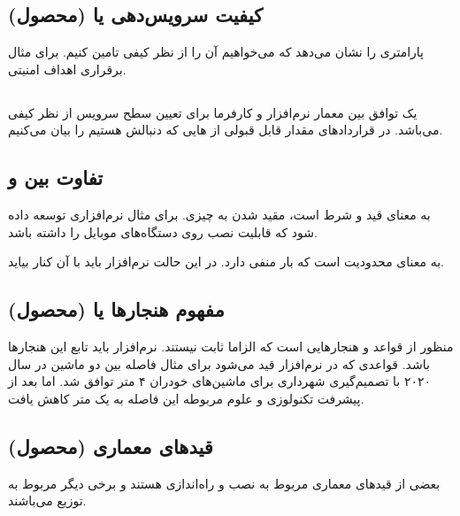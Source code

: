 \subsection{کیفیت سرویس‌دهی یا  (محصول)}

پارامتری را نشان می‌دهد که می‌خواهیم آن را از نظر کیفی تامین کنیم. برای مثال
برقراری اهداف امنیتی.

\subsection{}

یک توافق بین معمار نرم‌افزار و کارفرما برای تعیین سطح سرویس از نظر کیفی می‌باشد.
در قرار‌داد‌های  مقدار قابل قبولی از هایی که دنبالش هستیم را
بیان می‌کنیم.

\subsection{تفاوت بین  و }

 به معنای قید و شرط است، مقید شدن به چیزی. برای مثال نرم‌افزاری
توسعه داده شود که قابلیت نصب روی دستگاه‌های موبایل را داشته باشد.

 به معنای محدودیت است که بار منفی دارد. در این حالت نرم‌افزار
باید با آن کنار بیاید.

\subsection{مفهوم هنجار‌ها یا  (محصول)}

منظور از  قواعد و هنجار‌هایی است که الزاما ثابت نیستند. نرم‌افزار
باید تابع این هنجار‌ها باشد. قواعدی که در نرم‌افزار قید می‌شود برای مثال فاصله
بین دو ماشین در سال ۲۰۲۰ با تصمیم‌گیری شهرداری برای ماشین‌های خودران ۴ متر توافق
شد. اما بعد از پیشرفت تکنولوزی و علوم مربوطه این فاصله به یک متر کاهش یافت.

\subsection{قید‌های معماری  (محصول)}

بعضی از قید‌های معماری مربوط به نصب و راه‌اندازی هستند و برخی دیگر مربوط به
توزیع می‌باشند.

